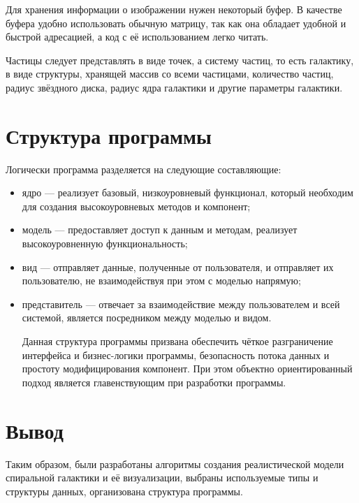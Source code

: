 Для хранения информации о изображении нужен некоторый буфер. В качестве буфера удобно использовать обычную матрицу, так как она обладает удобной и быстрой адресацией, а код с её использованием легко читать.

Частицы следует представлять в виде точек, а систему частиц, то есть галактику, в виде структуры, хранящей массив со всеми частицами, количество частиц, радиус звёздного диска, радиус ядра галактики и другие параметры галактики.

\section{Структура программы}
Логически программа разделяется на следующие составляющие:
\begin{itemize}
	\item ядро — реализует базовый, низкоуровневый функционал, который необходим для создания высокоуровневых методов и компонент;
	\item модель — предоставляет доступ к данным и методам, реализует высокоуровненную функциональность;
	\item вид — отправляет данные, полученные от пользователя, и отправляет их пользователю, не взаимодействуя при этом с моделью напрямую;
	\item представитель — отвечает за взаимодействие между пользователем и всей системой, является посредником между моделью и видом.

Данная структура программы призвана обеспечить чёткое разграничение интерфейса и бизнес-логики программы, безопасность потока данных и простоту модифицирования компонент. При этом объектно ориентированный подход является главенствующим при разработки программы.

\end{itemize}

\section{Вывод}
Таким образом, были разработаны алгоритмы создания реалистической модели спиральной галактики и её визуализации, выбраны используемые типы и структуры данных, организована структура программы.

